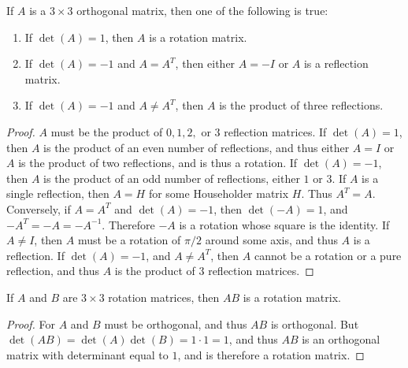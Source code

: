 \documentclass[../main.tex]{subfiles}
\begin{document}
%
\begin{theorem}
If $A$ is a $3\times 3$ orthogonal matrix, then one of the following is true:
\begin{enumerate}
\item If $\det(A) = 1$, then $A$ is a rotation matrix.
\item If $\det(A) = -1$ and $A=A^T$, then either $A=-I$ or $A$ is a reflection matrix.
\item If $\det(A) = -1$ and $A\ne A^T$, then $A$ is the product of three reflections.
\end{enumerate}
\end{theorem}
\begin{proof}
$A$ must be the product of $0,1,2,$ or $3$ reflection matrices. If $\det(A) = 1$, then $A$ is the product of an even number of reflections, and thus either $A=I$ or $A$ is the product of two reflections, and is thus a rotation. If $\det(A)=-1$, then $A$ is the product of an odd number of reflections, either $1$ or $3$. If $A$ is a single reflection, then $A=H$ for some Householder matrix $H$. Thus $A^T = A$. Conversely, if $A = A^T$ and $\det(A) = -1$, then $\det(-A) = 1$, and $-A^T = -A = -A^{-1}$. Therefore $-A$ is a rotation whose square is the identity. If $A\ne I$, then $A$ must be a rotation of $\pi/2$ around some axis, and thus $A$ is a reflection. If $\det(A) = -1$, and $A\ne A^T$, then $A$ cannot be a rotation or a pure reflection, and thus $A$ is the product of $3$ reflection matrices.
\end{proof}
%
\begin{theorem}
If $A$ and $B$ are $3\times 3$ rotation matrices, then $AB$ is a rotation matrix.
\end{theorem}
\begin{proof}
For $A$ and $B$ must be orthogonal, and thus $AB$ is orthogonal. But $\det(AB) = \det(A)\det(B) = 1\cdot 1 = 1$, and thus $AB$ is an orthogonal matrix with determinant equal to $1$, and is therefore a rotation matrix.
\end{proof}
%
\end{document}
